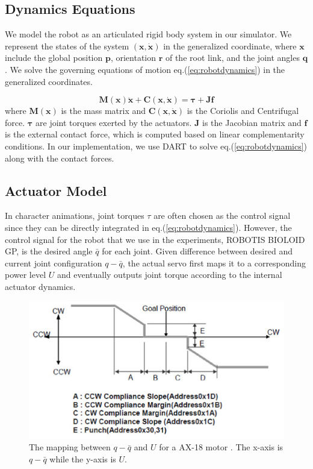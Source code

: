 \subsection{Dynamics Equations}

We model the robot as an articulated rigid body system in our simulator. We represent the states of the system $(\mathbf{x}, \dot{\mathbf{x}})$ in the generalized coordinate, where $\mathbf{x}$ include the global position $\mathbf{p}$, orientation $\mathbf{r}$ of the root link, and the joint angles $\mathbf{q}$. We solve the governing equations of motion eq.(\ref{eq:robotdynamics}) in the generalized coordinates.

\begin{equation}
\label{eq:robotdynamics}
\mathbf{M}(\mathbf{x})\mathbf{\ddot{x}}+\mathbf{C}(\mathbf{x},\mathbf{\dot{x}})=\mathbf{\tau}+\mathbf{Jf}
\end{equation}
where $\mathbf{M}(\mathbf{x})$ is the mass matrix and $\mathbf{C}(\mathbf{x},\mathbf{\dot{x}})$ is the Coriolis and Centrifugal force. $\mathbf{\tau}$ are joint torques exerted by the actuators. $\mathbf{J}$ is the Jacobian matrix and $\mathbf{f}$ is the external contact force, which is computed based on linear complementarity conditions. In our implementation, we use DART to solve eq.(\ref{eq:robotdynamics}) along with the contact forces.

\subsection{Actuator Model}

In character animations, joint torques $\tau$ are often chosen as the control signal since they can be directly integrated in eq.(\ref{eq:robotdynamics}). However, the control signal for the robot that we use in the experiments, ROBOTIS BIOLOID GP, is the desired angle $\bar{q}$ for each joint. Given difference between desired and current joint configuration ${q-\bar{q}}$, the actual servo first maps it to a corresponding power level $U$ and eventually outputs joint torque according to the internal actuator dynamics.

\begin{figure}[t]
\centering
\includegraphics[width=5in]{figures/ax18gain.eps}
\caption{The mapping between $q-\bar{q}$ and $U$ for a AX-18 motor \cite{AX18:2015}. The x-axis is $q-\bar{q}$ while the y-axis is $U$.}
\label{fig:actuatorMap}
\end{figure}

